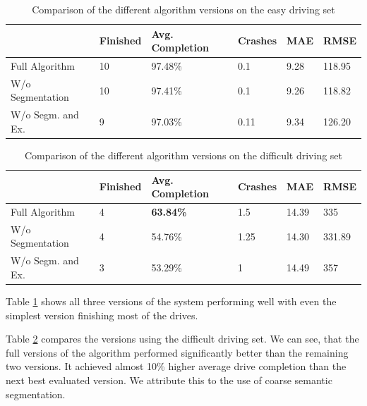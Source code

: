 \documentclass{ctuthesis/ctuthesis}
\begin{document}
\begin{table}[]
\tabcolsep=0.11cm
\begin{tabular}{l|lllll}
\hline
                                       & Finished & Avg. Completion  & Crashes & MAE  & RMSE   \\ \hline
Full Algorithm                         & 10       & 97.48\% & 0.1     & 9.28 & 118.95 \\
W/o Segmentation                    & 10       & 97.41\%          & 0.1     & 9.26 & 118.82 \\
W/o Segm. and Ex. & 9        & 97.03\%          & 0.11    & 9.34 & 126.20 \\ \hline
\end{tabular}
\caption{Comparison of the different algorithm versions on the easy driving set}\label{t:easy_drives}
\end{table}


\begin{table}[]
\tabcolsep=0.11cm
\begin{tabular}{l|lllll}
\hline
                                       & Finished & Avg. Completion & Crashes & MAE   & RMSE   \\ \hline
Full Algorithm                         & 4               & \textbf{63.84\%}         & 1.5     & 14.39 & 335    \\
W/o Segmentation                   & 4               & 54.76\%                  & 1.25    & 14.30 & 331.89 \\
W/o Segm. and Ex. & 3               & 53.29\%                  & 1       & 14.49 & 357    \\ \hline
\end{tabular}
\caption{Comparison of the different algorithm versions on the difficult driving set}\label{t:difficult_drives}
\end{table}

Table \ref{t:easy_drives} shows all three versions of the system performing well with even the simplest version finishing most of the drives. \par
Table \ref{t:difficult_drives} compares the versions using the difficult driving set. We can see, that the full versions of the algorithm performed significantly better than the remaining two versions. It achieved almost 10\% higher average drive completion than the next best evaluated version. We attribute this to the use of coarse semantic segmentation. \par
\end{document}
